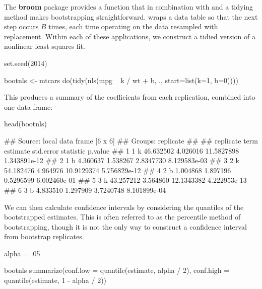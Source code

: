 The \textbf{broom} package provides a  function that in combination with  and a tidying method makes bootstrapping straightforward.  wraps a data table so that the next  step occurs $B$ times, each time operating on the data resampled with replacement. Within each of these  applications, we construct a tidied version of a nonlinear least squares fit.


\begin{example}
set.seed(2014)
\end{example}

\begin{example}
bootnls <- mtcars %
    do(tidy(nls(mpg ~ k / wt + b, ., start=list(k=1, b=0))))
\end{example}


This produces a summary of the coefficients from each replication, combined into one data frame:


\begin{example}
head(bootnls)
\end{example}

\begin{example}
## Source: local data frame [6 x 6]
## Groups: replicate
## 
##   replicate term  estimate std.error  statistic      p.value
## 1         1    k 46.632502  4.026016 11.5827898 1.343891e-12
## 2         1    b  4.360637  1.538267  2.8347730 8.129583e-03
## 3         2    k 54.182476  4.964976 10.9129374 5.756829e-12
## 4         2    b  1.004868  1.897196  0.5296599 6.002460e-01
## 5         3    k 43.257212  3.564860 12.1343382 4.222953e-13
## 6         3    b  4.833510  1.297909  3.7240748 8.101899e-04

\end{example}


We can then calculate confidence intervals by considering the quantiles of the bootstrapped estimates. This is often referred to as the percentile method of bootstrapping, though it is not the only way to construct a confidence interval from bootstrap replicates.


\begin{example}
alpha = .05
\end{example}

\begin{example}
bootnls %
    summarize(conf.low = quantile(estimate, alpha / 2),
              conf.high = quantile(estimate, 1 - alpha / 2))
\end{example}

